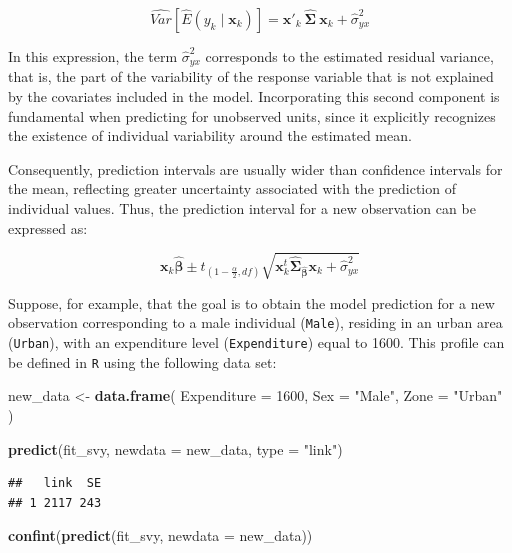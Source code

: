 \documentclass[
  english,
  12pt,
]{book}
\newenvironment{Shaded}{\begin{snugshade}}{\end{snugshade}}
\newcommand{\AttributeTok}[1]{\textcolor[rgb]{0.13,0.29,0.53}{#1}}
\newcommand{\DecValTok}[1]{\textcolor[rgb]{0.00,0.00,0.81}{#1}}
\newcommand{\FunctionTok}[1]{\textcolor[rgb]{0.13,0.29,0.53}{\textbf{#1}}}
\newcommand{\NormalTok}[1]{#1}
\newcommand{\OtherTok}[1]{\textcolor[rgb]{0.56,0.35,0.01}{#1}}
\newcommand{\StringTok}[1]{\textcolor[rgb]{0.31,0.60,0.02}{#1}}
\begin{document}
\[
\widehat{Var}\left[\hat{E}\left(y_{k}\mid\mathbf{x}_{k}\right)\right]
=
\mathbf{x}'_{k} \
\hat{\boldsymbol{\Sigma}} \
\mathbf{x}_{k}
+
\hat{\sigma}^2_{yx}
\]

In this expression, the term \(\hat{\sigma}^2_{yx}\) corresponds to the estimated residual variance, that is, the part of the variability of the response variable that is not explained by the covariates included in the model. Incorporating this second component is fundamental when predicting for unobserved units, since it explicitly recognizes the existence of individual variability around the estimated mean.

Consequently, prediction intervals are usually wider than confidence intervals for the mean, reflecting greater uncertainty associated with the prediction of individual values. Thus, the prediction interval for a new observation can be expressed as:

\[
\mathbf{x}_{k}\hat{\boldsymbol{\beta}}
\pm
t_{\left(1-\frac{\alpha}{2},df\right)}
\sqrt{
\mathbf{x}_{k}^{t}
\hat{\boldsymbol{\Sigma}}_{\hat{\boldsymbol{\beta}}}
\mathbf{x}_{k}
+
\hat{\sigma}^2_{yx}
}
\]

Suppose, for example, that the goal is to obtain the model prediction for a new observation corresponding to a male individual (\texttt{Male}), residing in an urban area (\texttt{Urban}), with an expenditure level (\texttt{Expenditure}) equal to 1600. This profile can be defined in \texttt{R} using the following data set:

\begin{Shaded}
\begin{Highlighting}[]
\NormalTok{new\_data }\OtherTok{\textless{}{-}} \FunctionTok{data.frame}\NormalTok{(}
  \AttributeTok{Expenditure =} \DecValTok{1600}\NormalTok{,}
  \AttributeTok{Sex =} \StringTok{"Male"}\NormalTok{,}
  \AttributeTok{Zone =} \StringTok{"Urban"}
\NormalTok{)}

\FunctionTok{predict}\NormalTok{(fit\_svy, }\AttributeTok{newdata =}\NormalTok{ new\_data, }\AttributeTok{type =} \StringTok{"link"}\NormalTok{)}
\end{Highlighting}
\end{Shaded}

\begin{verbatim}
##   link  SE
## 1 2117 243
\end{verbatim}

\begin{Shaded}
\begin{Highlighting}[]
\FunctionTok{confint}\NormalTok{(}\FunctionTok{predict}\NormalTok{(fit\_svy, }\AttributeTok{newdata =}\NormalTok{ new\_data))}
\end{Highlighting}
\end{Shaded}
\end{document}
